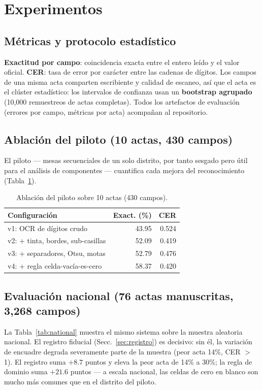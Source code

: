 \documentclass[conference]{IEEEtran}
\begin{document}
\section{Experimentos}
\subsection{M\'etricas y protocolo estad\'istico}
\textbf{Exactitud por campo}: coincidencia exacta entre el entero le\'ido y
el valor oficial. \textbf{CER}: tasa de error por car\'acter entre las
cadenas de d\'igitos. Los campos de una misma acta comparten escribiente y
calidad de escaneo, as\'i que el acta es el cl\'uster estad\'istico: los
intervalos de confianza usan un \textbf{bootstrap agrupado} (10,000
remuestreos de actas completas). Todos los artefactos de evaluaci\'on
(errores por campo, m\'etricas por acta) acompa\~nan al repositorio.

\subsection{Ablaci\'on del piloto (10 actas, 430 campos)}
El piloto --- mesas secuenciales de un solo distrito, por tanto sesgado pero
\'util para el an\'alisis de componentes --- cuantifica cada mejora del
reconocimiento (Tabla~\ref{tab:pilot}).

\begin{table}[t]
\caption{Ablaci\'on del piloto sobre 10 actas (430 campos).}
\label{tab:pilot}
\centering
\begin{tabular}{lrr}
\toprule
Configuraci\'on & Exact. (\%) & CER \\
\midrule
v1: OCR de d\'igitos crudo & 43.95 & 0.524 \\
v2: + tinta, bordes, sub-casillas & 52.09 & 0.419 \\
v3: + separadores, Otsu, motas & 52.79 & 0.476 \\
v4: + regla celda-vac\'ia-es-cero & 58.37 & 0.420 \\
\bottomrule
\end{tabular}
\end{table}

\subsection{Evaluaci\'on nacional (76 actas manuscritas, 3,268 campos)}
La Tabla~\ref{tab:national} muestra el mismo sistema sobre la muestra
aleatoria nacional. El registro fiducial (Secc.~\ref{sec:registro}) es
decisivo: sin \'el, la variaci\'on de encuadre degrada severamente parte de
la muestra (peor acta 14\%, CER $>$ 1). El registro suma $+8.7$ puntos y
eleva la peor acta de 14\% a 30\%; la regla de dominio suma $+21.6$ puntos
--- a escala nacional, las celdas de cero en blanco son mucho m\'as comunes
que en el distrito del piloto.
\end{document}
